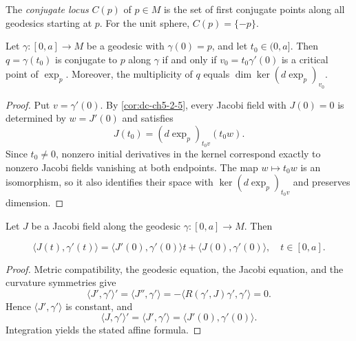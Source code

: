 \begin{definition}
  \label{def:dc-ch5-3-4}

  The \emph{conjugate locus} $C(p)$ of $p\in M$ is the set of first conjugate
  points along all geodesics starting at $p$. For the unit sphere,
  $C(p)=\{-p\}$.
\end{definition}

\begin{proposition}
  \label{prop:dc-ch5-3-5}


  Let $\gamma:[0,a]\to M$ be a geodesic with $\gamma(0)=p$, and let
  $t_0\in(0,a]$. Then $q=\gamma(t_0)$ is conjugate to $p$ along $\gamma$ if and
  only if $v_0=t_0\gamma'(0)$ is a critical point of $\exp_p$. Moreover, the
  multiplicity of $q$ equals $\dim\ker(d\exp_p)_{v_0}$.
\end{proposition}
\begin{proof}
  \sketch
  Put $v=\gamma'(0)$. By \cref{cor:dc-ch5-2-5}, every Jacobi field with
  $J(0)=0$ is determined by $w=J'(0)$ and satisfies
  $$
  J(t_0)=(d\exp_p)_{t_0v}(t_0w).
  $$
  Since $t_0\ne0$, nonzero initial derivatives in the kernel correspond exactly
  to nonzero Jacobi fields vanishing at both endpoints. The map
  $w\mapsto t_0w$ is an isomorphism, so it also identifies their space with
  $\ker(d\exp_p)_{t_0v}$ and preserves dimension.
\end{proof}

\begin{proposition}
  \label{prop:dc-ch5-3-6}


  Let $J$ be a Jacobi field along the geodesic $\gamma:[0,a]\to M$. Then

  $$
  \langle J(t),\gamma'(t)\rangle=\langle J'(0),\gamma'(0)\rangle t+\langle J(0),\gamma'(0)\rangle,\quad t\in[0,a].
  $$

\end{proposition}
\begin{proof}

  \sketch
  Metric compatibility, the geodesic equation, the Jacobi equation, and the
  curvature symmetries give
  $$
  \langle J',\gamma'\rangle'=\langle J'',\gamma'\rangle=-\langle R(\gamma',J)\gamma',\gamma'\rangle=0.
  $$
  Hence $\langle J',\gamma'\rangle$ is constant, and
  $$
  \langle J,\gamma'\rangle'=\langle J',\gamma'\rangle=\langle J'(0),\gamma'(0)\rangle.
  $$
  Integration yields the stated affine formula.
\end{proof}

